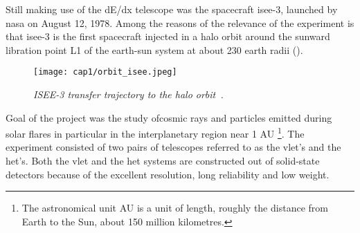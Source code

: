 \hskip 1cm Still making use of the dE/dx telescope was the spacecraft
\gls{isee}-3, launched by \gls{nasa} on August 12, 1978. Among the
reasons of the relevance of the experiment is that \gls{isee}-3 is the
first spacecraft injected in a halo orbit around the sunward libration
point L1 of the earth-sun system at about 230 earth radii ().
\begin{figure}[!htbp]
  \centering
  \texttt{[image: cap1/orbit\_isee.jpeg]}
  \caption{\textit{ISEE-3 transfer trajectory to the halo orbit~\cite{}.}}\label{orbit_isee}
\end{figure}
Goal of the project was the study ofcosmic rays and particles emitted
during solar flares in particular in the interplanetary region near 1
AU \footnote{The astronomical unit AU is a unit of length, roughly the
  distance from Earth to the Sun, about 150 million kilometres.}.  The
experiment consisted of two pairs of telescopes referred to as the
\gls{vlet}'s and the \gls{het}'s. Both the \gls{vlet} and the
\gls{het} systems are constructed out of solid-state detectors because
of the excellent resolution, long
reliability and low weight.\\
\begin{table}[!htbp]
  \centering
  \caption{Area and thickness of the ISEE-3 VLET (a) and HET (a) detectors.}
  \vspace{.5cm}
\end{table}

